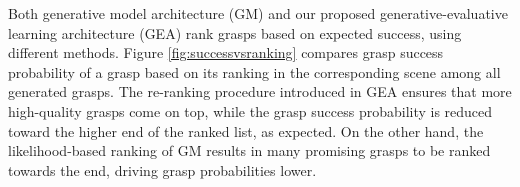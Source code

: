 Both generative model architecture (GM) and our proposed generative-evaluative learning architecture (GEA) rank grasps based on expected success, using different methods. Figure \ref{fig:successvsranking} compares grasp success probability of a grasp based on its ranking in the corresponding scene among all generated grasps. The re-ranking procedure introduced in GEA ensures that more high-quality grasps come on top, while the grasp success probability is reduced toward the higher end of the ranked list, as expected. On the other hand, the likelihood-based ranking of GM results in many promising grasps to be ranked towards the end, driving grasp probabilities lower. 



%
